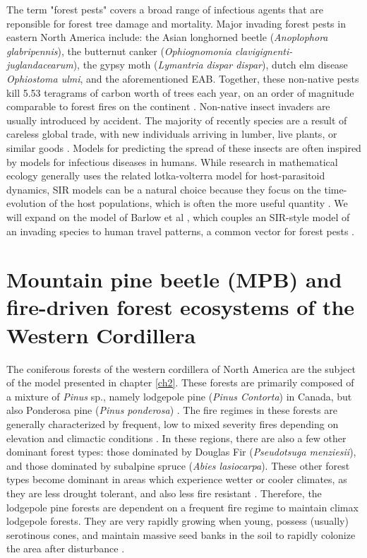 The term "forest pests" covers a broad range of infectious agents that are reponsible for forest tree damage and mortality. Major invading forest pests in eastern North America include: the Asian longhorned beetle (\textit{Anoplophora glabripennis}), the butternut canker (\textit{Ophiognomonia clavigignenti-juglandacearum}), the gypsy moth (\textit{Lymantria dispar dispar}), dutch elm disease \textit{Ophiostoma ulmi}, and the aforementioned EAB. Together, these non-native pests kill 5.53 teragrams of carbon worth of trees each year, on an order of magnitude comparable to forest fires on the continent \cite{fei2019biomass}. Non-native insect invaders are usually introduced by accident. The majority of recently species are a result of careless global trade, with new individuals arriving in lumber, live plants, or similar goods \cite{brockerhoff2017ecology}. Models for predicting the spread of these insects are often inspired by models for infectious diseases in humans. While research in mathematical ecology generally uses the related lotka-volterra model for host-parasitoid dynamics, SIR models can be a natural choice because they focus on the time-evolution of the host populations, which is often the more useful quantity \cite{edelstein2005mathematical}. We will expand on the model of Barlow et al \cite{barlow2014modelling}, which couples an SIR-style model of an invading species to human travel patterns, a common vector for forest pests \cite{buck2009hitchhikingm,kolar2001progress,wilson2009something}.

\section{Mountain pine beetle (MPB) and fire-driven forest ecosystems of the Western Cordillera}

The coniferous forests of the western cordillera of North America are the subject of the model presented in chapter \ref{ch2}. These forests are primarily composed of a mixture of \textit {Pinus} sp., namely lodgepole pine (\textit{Pinus Contorta}) in Canada, but also Ponderosa pine (\textit{Pinus ponderosa}) \cite{brown2010impact}. The fire regimes in these forests are generally characterized by frequent, low to mixed severity fires depending on elevation and climactic conditions \cite{agee1996fire,arno1980forest}. In these regions, there are also a few other dominant forest types: those dominated by Douglas Fir (\textit{Pseudotsuga menziesii}), and those dominated by subalpine spruce (\textit{Abies lasiocarpa}). These other forest types become dominant in areas which experience wetter or cooler climates, as they are less drought tolerant, and also less fire resistant \cite{JENKINS200816}. Therefore, the lodgepole pine forests are dependent on a frequent fire regime to maintain climax lodgepole forests. They are very rapidly growing when young, possess (usually) serotinous cones, and maintain massive seed banks in the soil to rapidly colonize the area after disturbance \cite{lotan1976cone,lotan1985role}.



